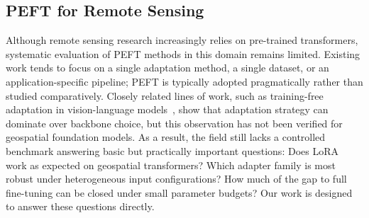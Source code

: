 \subsection{PEFT for Remote Sensing}
Although remote sensing research increasingly relies on pre-trained transformers, systematic evaluation of PEFT methods in this domain remains limited. Existing work tends to focus on a single adaptation method, a single dataset, or an application-specific pipeline; PEFT is typically adopted pragmatically rather than studied comparatively. Closely related lines of work, such as training-free adaptation in vision-language models~\cite{zhang2022tip}, show that adaptation strategy can dominate over backbone choice, but this observation has not been verified for geospatial foundation models. As a result, the field still lacks a controlled benchmark answering basic but practically important questions: Does LoRA~\cite{hu2022lora} work as expected on geospatial transformers? Which adapter family is most robust under heterogeneous input configurations? How much of the gap to full fine-tuning can be closed under small parameter budgets? Our work is designed to answer these questions directly.
